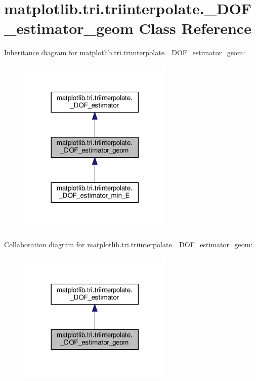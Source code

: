 \hypertarget{classmatplotlib_1_1tri_1_1triinterpolate_1_1__DOF__estimator__geom}{}\section{matplotlib.\+tri.\+triinterpolate.\+\_\+\+D\+O\+F\+\_\+estimator\+\_\+geom Class Reference}
\label{classmatplotlib_1_1tri_1_1triinterpolate_1_1__DOF__estimator__geom}


Inheritance diagram for matplotlib.\+tri.\+triinterpolate.\+\_\+\+D\+O\+F\+\_\+estimator\+\_\+geom\+:
\nopagebreak
\begin{figure}[H]
\begin{center}
\leavevmode
\includegraphics[width=209pt]{classmatplotlib_1_1tri_1_1triinterpolate_1_1__DOF__estimator__geom__inherit__graph}
\end{center}
\end{figure}


Collaboration diagram for matplotlib.\+tri.\+triinterpolate.\+\_\+\+D\+O\+F\+\_\+estimator\+\_\+geom\+:
\nopagebreak
\begin{figure}[H]
\begin{center}
\leavevmode
\includegraphics[width=209pt]{classmatplotlib_1_1tri_1_1triinterpolate_1_1__DOF__estimator__geom__coll__graph}
\end{center}
\end{figure}
